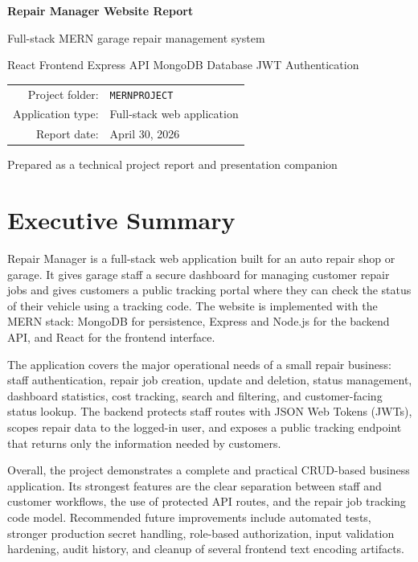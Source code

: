 \documentclass[12pt,a4paper]{report}
\newcommand{\projectname}{Repair Manager}
\newcommand{\stackname}{MERN}
\begin{document}
\begin{titlepage}
  \centering
  \vspace*{1.0cm}
  {\Huge\bfseries \projectname{} Website Report\par}
  \vspace{0.4cm}
  {\Large Full-stack MERN garage repair management system\par}
  \vspace{1.2cm}
  {\large React Frontend \quad Express API \quad MongoDB Database \quad JWT Authentication\par}
  \vfill
  \begin{tabular}{rl}
    Project folder: & \texttt{MERNPROJECT}\\
    Application type: & Full-stack web application\\
    Report date: & April 30, 2026\\
  \end{tabular}
  \vfill
  {\large Prepared as a technical project report and presentation companion\par}
\end{titlepage}

\tableofcontents
\clearpage
{}

\chapter*{Executive Summary}

\projectname{} is a full-stack web application built for an auto repair shop or garage. It gives garage staff a secure dashboard for managing customer repair jobs and gives customers a public tracking portal where they can check the status of their vehicle using a tracking code. The website is implemented with the \stackname{} stack: MongoDB for persistence, Express and Node.js for the backend API, and React for the frontend interface.

The application covers the major operational needs of a small repair business: staff authentication, repair job creation, update and deletion, status management, dashboard statistics, cost tracking, search and filtering, and customer-facing status lookup. The backend protects staff routes with JSON Web Tokens (JWTs), scopes repair data to the logged-in user, and exposes a public tracking endpoint that returns only the information needed by customers.

Overall, the project demonstrates a complete and practical CRUD-based business application. Its strongest features are the clear separation between staff and customer workflows, the use of protected API routes, and the repair job tracking code model. Recommended future improvements include automated tests, stronger production secret handling, role-based authorization, input validation hardening, audit history, and cleanup of several frontend text encoding artifacts.
\end{document}
